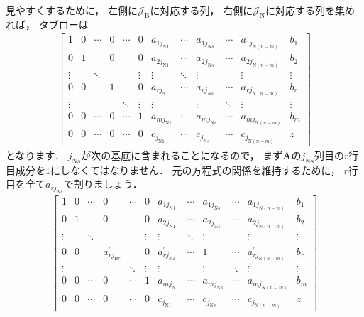 ﻿\documentclass[a4paper]{jsarticle}
\begin{document}
見やすくするために，
左側に$\mathcal{J}_{\mathrm{B}}$に対応する列，
右側に$\mathcal{J}_{\mathrm{N}}$に対応する列を集めれば，
タブローは
\begin{align*}
\left[\begin{array}{cccccc|ccccc|c}
 1 & 0 & \cdots & 0 & \cdots & 0 & a_{1j_{\mathrm{N}1}} & \cdots & a_{1j_{\mathrm{N}s}} & \cdots & a_{1j_{\mathrm{N}(n-m)}} & b_{1} \\
 0 & 1 &        & 0 &        & 0 & a_{2j_{\mathrm{N}1}} & \cdots & a_{2j_{\mathrm{N}s}} & \cdots & a_{2j_{\mathrm{N}(n-m)}} & b_{2} \\
\vdots & & \ddots & & & \vdots & \vdots & \ddots &  \vdots & &  \vdots & \vdots \\
 0 & 0 &        & 1 & & 0 & a_{rj_{\mathrm{N}1}} & \cdots & a_{rj_{\mathrm{N}s}} & \cdots & a_{rj_{\mathrm{N}(n-m)}} & b_{r} \\
\vdots & & & & \ddots & \vdots & \vdots & &  \vdots & \ddots &  \vdots & \vdots \\
 0 & 0 & \cdots & 0 & \cdots & 1 & a_{mj_{\mathrm{N}1}} & \cdots & a_{mj_{\mathrm{N}s}} & \cdots & a_{mj_{\mathrm{N}(n-m)}} & b_{m} \\
\hline
 0 & 0 & \cdots & 0 & \cdots & 0 & c_{j_{\mathrm{N}1}} & \cdots & c_{j_{\mathrm{N}s}} & \cdots & c_{j_{\mathrm{N}(n-m)}} & z
\end{array}
\right]
\end{align*}
となります．
$j_{\mathrm{N}s}$が次の基底に含まれることになるので，
まず$\boldsymbol{A}$の$j_{\mathrm{N}s}$列目の$r$行目成分を$1$にしなくてはなりません．
元の方程式の関係を維持するために，
$r$行目を全て$a_{rj_{\mathrm{N}s}}$で割りましょう．
\begin{align*}
\left[\begin{array}{cccccc|ccccc|c}
 1 & 0 & \cdots & 0 & \cdots & 0 & a_{1j_{\mathrm{N}1}} & \cdots & a_{1j_{\mathrm{N}s}} & \cdots & a_{1j_{\mathrm{N}(n-m)}} & b_{1} \\
 0 & 1 &        & 0 &        & 0 & a_{2j_{\mathrm{N}1}} & \cdots & a_{2j_{\mathrm{N}s}} & \cdots & a_{2j_{\mathrm{N}(n-m)}} & b_{2} \\
\vdots & & \ddots & & & \vdots & \vdots & \ddots &  \vdots & &  \vdots & \vdots \\
 0 & 0 &        &a_{rj_{\mathrm{B}r}}^{\prime} & & 0 & a_{rj_{\mathrm{N}1}}^{\prime} & \cdots & 1 & \cdots & a_{rj_{\mathrm{N}(n-m)}}^{\prime} & b_{r}^{\prime} \\
\vdots & & & & \ddots & \vdots & \vdots & &  \vdots & \ddots &  \vdots & \vdots \\
 0 & 0 & \cdots & 0 & \cdots & 1 & a_{mj_{\mathrm{N}1}} & \cdots & a_{mj_{\mathrm{N}s}} & \cdots & a_{mj_{\mathrm{N}(n-m)}} & b_{m} \\
\hline
 0 & 0 & \cdots & 0 & \cdots & 0 & c_{j_{\mathrm{N}1}} & \cdots & c_{j_{\mathrm{N}s}} & \cdots & c_{j_{\mathrm{N}(n-m)}} & z
\end{array}
\right]
\end{align*}
\end{document}
